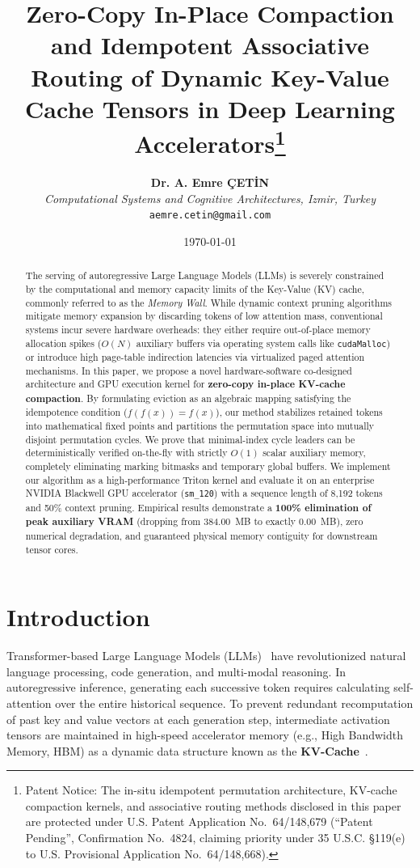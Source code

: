 \documentclass[journal,10pt,twocolumn]{article}
\title{\textbf{Zero-Copy In-Place Compaction and Idempotent Associative Routing of Dynamic Key-Value Cache Tensors in Deep Learning Accelerators}\thanks{Patent Notice: The in-situ idempotent permutation architecture, KV-cache compaction kernels, and associative routing methods disclosed in this paper are protected under U.S. Patent Application No.~64/148,679 (``Patent Pending'', Confirmation No.~4824, claiming priority under 35 U.S.C. \S 119(e) to U.S. Provisional Application No.~64/148,668).}}
\author{
    \textbf{Dr. A. Emre \c{C}ET\.{I}N}\\
    \textit{Computational Systems and Cognitive Architectures, Izmir, Turkey}\\
    \texttt{aemre.cetin@gmail.com}
}
\date{\today}
\begin{document}
\maketitle

\begin{abstract}
The serving of autoregressive Large Language Models (LLMs) is severely constrained by the computational and memory capacity limits of the Key-Value (KV) cache, commonly referred to as the \textit{Memory Wall}. While dynamic context pruning algorithms mitigate memory expansion by discarding tokens of low attention mass, conventional systems incur severe hardware overheads: they either require out-of-place memory allocation spikes ($O(N)$ auxiliary buffers via operating system calls like \texttt{cudaMalloc}) or introduce high page-table indirection latencies via virtualized paged attention mechanisms. In this paper, we propose a novel hardware-software co-designed architecture and GPU execution kernel for \textbf{zero-copy in-place KV-cache compaction}. By formulating eviction as an algebraic mapping satisfying the idempotence condition ($f(f(x)) = f(x)$), our method stabilizes retained tokens into mathematical fixed points and partitions the permutation space into mutually disjoint permutation cycles. We prove that minimal-index cycle leaders can be deterministically verified on-the-fly with strictly $O(1)$ scalar auxiliary memory, completely eliminating marking bitmasks and temporary global buffers. We implement our algorithm as a high-performance Triton kernel and evaluate it on an enterprise NVIDIA Blackwell GPU accelerator (\texttt{sm\_120}) with a sequence length of 8,192 tokens and 50\% context pruning. Empirical results demonstrate a \textbf{100\% elimination of peak auxiliary VRAM} (dropping from 384.00~MB to exactly 0.00~MB), zero numerical degradation, and guaranteed physical memory contiguity for downstream tensor cores.
\end{abstract}

\section{Introduction}
\label{sec:intro}
Transformer-based Large Language Models (LLMs)~\cite{vaswani2017attention} have revolutionized natural language processing, code generation, and multi-modal reasoning. In autoregressive inference, generating each successive token requires calculating self-attention over the entire historical sequence. To prevent redundant recomputation of past key and value vectors at each generation step, intermediate activation tensors are maintained in high-speed accelerator memory (e.g., High Bandwidth Memory, HBM) as a dynamic data structure known as the \textbf{KV-Cache}~\cite{pope2023efficiently}.
\end{document}

